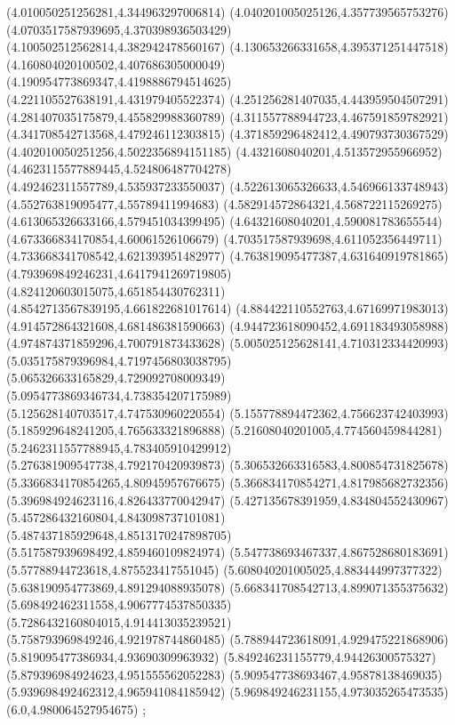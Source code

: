 {(4.010050251256281,4.344963297006814)
(4.040201005025126,4.357739565753276)
(4.0703517587939695,4.370398936503429)
(4.100502512562814,4.382942478560167)
(4.130653266331658,4.395371251447518)
(4.160804020100502,4.407686305000049)
(4.190954773869347,4.4198886794514625)
(4.221105527638191,4.431979405522374)
(4.251256281407035,4.443959504507291)
(4.281407035175879,4.455829988360789)
(4.311557788944723,4.467591859782921)
(4.341708542713568,4.479246112303815)
(4.371859296482412,4.490793730367529)
(4.402010050251256,4.5022356894151185)
(4.4321608040201,4.513572955966952)
(4.4623115577889445,4.524806487704278)
(4.492462311557789,4.535937233550037)
(4.522613065326633,4.546966133748943)
(4.552763819095477,4.55789411994683)
(4.582914572864321,4.568722115269275)
(4.613065326633166,4.579451034399495)
(4.64321608040201,4.590081783655544)
(4.673366834170854,4.60061526106679)
(4.703517587939698,4.611052356449711)
(4.733668341708542,4.621393951482977)
(4.763819095477387,4.631640919781865)
(4.793969849246231,4.6417941269719805)
(4.824120603015075,4.651854430762311)
(4.8542713567839195,4.661822681017614)
(4.884422110552763,4.67169971983013)
(4.914572864321608,4.681486381590663)
(4.944723618090452,4.691183493058988)
(4.974874371859296,4.700791873433628)
(5.005025125628141,4.710312334420993)
(5.035175879396984,4.7197456803038795)
(5.065326633165829,4.729092708009349)
(5.0954773869346734,4.738354207175989)
(5.125628140703517,4.747530960220554)
(5.155778894472362,4.756623742403993)
(5.185929648241205,4.765633321896888)
(5.21608040201005,4.774560459844281)
(5.2462311557788945,4.783405910429912)
(5.276381909547738,4.792170420939873)
(5.306532663316583,4.800854731825678)
(5.3366834170854265,4.80945957676675)
(5.366834170854271,4.817985682732356)
(5.396984924623116,4.826433770042947)
(5.427135678391959,4.834804552430967)
(5.457286432160804,4.843098737101081)
(5.487437185929648,4.8513170247898705)
(5.517587939698492,4.859460109824974)
(5.547738693467337,4.867528680183691)
(5.57788944723618,4.875523417551045)
(5.608040201005025,4.883444997377322)
(5.638190954773869,4.891294088935078)
(5.668341708542713,4.899071355375632)
(5.698492462311558,4.9067774537850335)
(5.7286432160804015,4.914413035239521)
(5.758793969849246,4.921978744860485)
(5.788944723618091,4.929475221868906)
(5.819095477386934,4.93690309963932)
(5.849246231155779,4.94426300575327)
(5.879396984924623,4.951555562052283)
(5.909547738693467,4.95878138469035)
(5.939698492462312,4.965941084185942)
(5.969849246231155,4.973035265473535)
(6.0,4.980064527954675)
};
